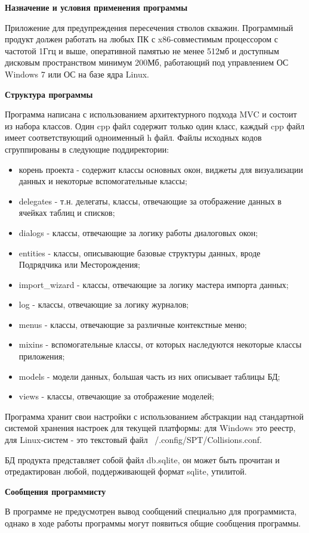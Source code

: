 \textbf{Назначение и условия применения программы}

Приложение для предупреждения пересечения стволов скважин.
Программный продукт должен работать на любых ПК с x86-совместимым процессором с частотой 1Ггц и выше,
оперативной памятью не менее 512мб и доступным дисковым пространством минимум 200Мб, работающий под
управлением ОС Windows 7 или ОС на базе ядра Linux.

\textbf{Структура программы}

Программа написана с использованием архитектурного подхода MVC и состоит из набора классов. Один cpp файл содержит только
один класс, каждый cpp файл имеет соответствующий одноименный h файл. Файлы исходных кодов сгруппированы в следующие
поддиректории:
\begin{itemize}
  \item корень проекта - содержит классы основных окон, виджеты для визуализации данных и некоторые вспомогательные классы;
  \item delegates - т.н. делегаты, классы, отвечающие за отображение данных в ячейках таблиц и списков;
  \item dialogs - классы, отвечающие за логику работы диалоговых окон;
  \item entities - классы, описывающие базовые структуры данных, вроде Подрядчика или Месторождения;
  \item import\_wizard - классы, отвечающие за логику мастера импорта данных;
  \item log - классы, отвечающие за логику журналов;
  \item menus - классы, отвечающие за различные контекстные меню;
  \item mixins - вспомогательные классы, от которых наследуются некоторые классы приложения;
  \item models - модели данных, большая часть из них описывает таблицы БД;
  \item views - классы, отвечающие за отображение моделей;
\end{itemize}

Программа хранит свои настройки с использованием абстракции над стандартной системой хранения настроек для текущей платформы:
для Windows это реестр, для Linux-систем - это текстовый файл ~/.config/SPT/Collisions.conf.

БД продукта представляет собой файл db.sqlite, он может быть прочитан и отредактирован любой, поддерживающей формат sqlite, утилитой.

\textbf{Сообщения программисту}

В программе не предусмотрен вывод сообщений специально для программиста, однако в ходе работы программы могут появиться
общие сообщения программы.
